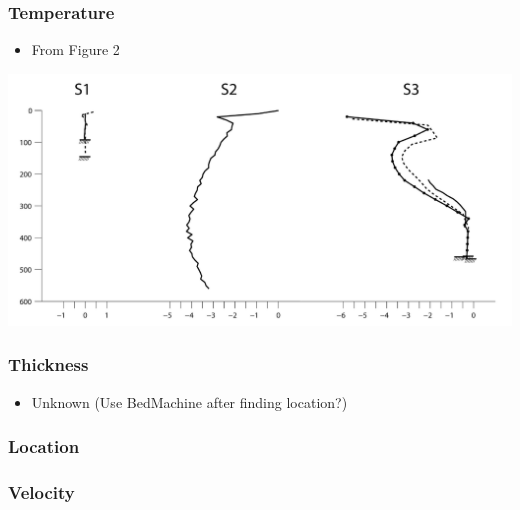 \documentclass[article,a4paper,times,11pt,twoside]{article}
\begin{document}
\subsubsection{Temperature}
\label{sec:org9e8ee39}

\begin{itemize}
\item From \textcite{harrington_2015} Figure 2
\end{itemize}

\begin{center}
\includegraphics[width=.9\linewidth]{h2015_s2a/harrington_2015_fig2_S1_S2_S3.png}
\end{center}

\subsubsection{Thickness}
\label{sec:org14322d2}

\begin{itemize}
\item Unknown (Use BedMachine after finding location?)
\end{itemize}

\subsubsection{Location}
\label{sec:org125bb65}

\subsubsection{Velocity}
\label{sec:org59ae56c}
\clearpage
\end{document}
